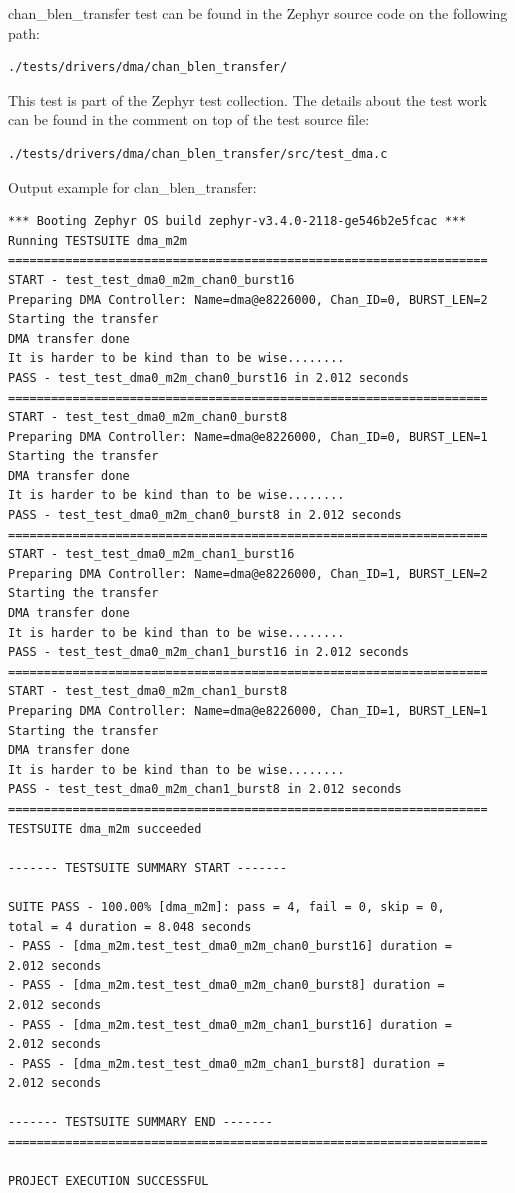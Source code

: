 \documentclass[11pt,a4paper,oneside]{article}
\begin{document}
chan\_blen\_transfer test can be found in the Zephyr source code on the
following path:

\begin{lstlisting}
./tests/drivers/dma/chan_blen_transfer/
\end{lstlisting}

This test is part of the Zephyr test collection. The details about the
test work can be found in the comment on top of the test source file:
\begin{lstlisting}
./tests/drivers/dma/chan_blen_transfer/src/test_dma.c
\end{lstlisting}

Output example for clan\_blen\_transfer:

\begin{lstlisting}
*** Booting Zephyr OS build zephyr-v3.4.0-2118-ge546b2e5fcac ***
Running TESTSUITE dma_m2m
===================================================================
START - test_test_dma0_m2m_chan0_burst16
Preparing DMA Controller: Name=dma@e8226000, Chan_ID=0, BURST_LEN=2
Starting the transfer
DMA transfer done
It is harder to be kind than to be wise........
PASS - test_test_dma0_m2m_chan0_burst16 in 2.012 seconds
===================================================================
START - test_test_dma0_m2m_chan0_burst8
Preparing DMA Controller: Name=dma@e8226000, Chan_ID=0, BURST_LEN=1
Starting the transfer
DMA transfer done
It is harder to be kind than to be wise........
PASS - test_test_dma0_m2m_chan0_burst8 in 2.012 seconds
===================================================================
START - test_test_dma0_m2m_chan1_burst16
Preparing DMA Controller: Name=dma@e8226000, Chan_ID=1, BURST_LEN=2
Starting the transfer
DMA transfer done
It is harder to be kind than to be wise........
PASS - test_test_dma0_m2m_chan1_burst16 in 2.012 seconds
===================================================================
START - test_test_dma0_m2m_chan1_burst8
Preparing DMA Controller: Name=dma@e8226000, Chan_ID=1, BURST_LEN=1
Starting the transfer
DMA transfer done
It is harder to be kind than to be wise........
PASS - test_test_dma0_m2m_chan1_burst8 in 2.012 seconds
===================================================================
TESTSUITE dma_m2m succeeded

------- TESTSUITE SUMMARY START -------

SUITE PASS - 100.00% [dma_m2m]: pass = 4, fail = 0, skip = 0,
total = 4 duration = 8.048 seconds
- PASS - [dma_m2m.test_test_dma0_m2m_chan0_burst16] duration =
2.012 seconds
- PASS - [dma_m2m.test_test_dma0_m2m_chan0_burst8] duration =
2.012 seconds
- PASS - [dma_m2m.test_test_dma0_m2m_chan1_burst16] duration =
2.012 seconds
- PASS - [dma_m2m.test_test_dma0_m2m_chan1_burst8] duration =
2.012 seconds

------- TESTSUITE SUMMARY END -------
===================================================================

PROJECT EXECUTION SUCCESSFUL
\end{lstlisting}
\end{document}
